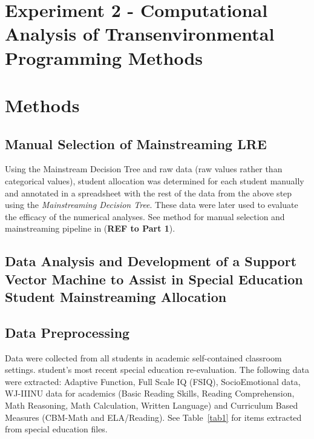 \documentclass[twoside]{article}
\begin{document}
\null\newpage

\section{Experiment 2 - Computational Analysis of Transenvironmental Programming Methods}
\section{Methods}
\subsection{Manual Selection of Mainstreaming LRE}
Using the Mainstream Decision Tree and raw data (raw values rather than categorical values), student allocation was determined for each student manually and annotated in a spreadsheet with the rest of the data from the above step using the \textit{Mainstreaming Decision Tree}. These data were later used to evaluate the efficacy of the numerical analyses. See method for manual selection and mainstreaming pipeline in (\textbf{REF to Part 1}).

\subsection{Data Analysis and Development of a Support Vector Machine to Assist in Special Education Student Mainstreaming Allocation}
\subsection{Data Preprocessing}
Data were collected from all students in academic self-contained classroom settings.  student's most recent special education re-evaluation. The following data were extracted: Adaptive Function, Full Scale IQ (FSIQ), SocioEmotional data, WJ-IIINU data for academics (Basic Reading Skills, Reading Comprehension, Math Reasoning, Math Calculation, Written Language) and Curriculum Based Measures (CBM-Math and ELA/Reading). See Table~\ref{tab1} for items extracted from special education files.
\end{document}
